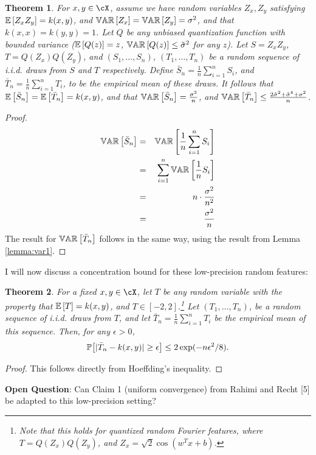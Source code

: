 \documentclass[12pt]{article}
\newcommand{\bS}{\bar{S}}
\newcommand{\bT}{\bar{T}}
\newcommand{\eps}{\epsilon}
\newcommand{\tsigma}{\tilde{\sigma}}
\newtheorem{theorem}{Theorem}[section]
\begin{document}
\begin{theorem}
\label{thm:varn}
For $x,y\in\cX$, assume we have random variables $Z_x,Z_y$ satisfying $\expect{}{Z_xZ_y} = k(x,y)$, and $\var{}{Z_x} = \var{}{Z_y} = \sigma^2$, and that $k(x,x) = k(y,y) = 1$.
Let $Q$ be any unbiased quantization function with bounded variance ($\expect{}{Q(z)} = z$, $\var{}{Q(z)} \leq \tsigma^2$ for any $z$).  Let $S=Z_x Z_y$, $T = Q(Z_x)Q(Z_y)$, and $(S_1,\ldots,S_n)$, $(T_1,\ldots,T_n)$ be a random sequence of i.i.d. draws from $S$ and $T$ respectively.  Define $\bar{S}_n = \frac{1}{n}\sum_{i=1}^n S_i$, and $\bar{T}_n =  \frac{1}{n}\sum_{i=1}^n T_i$, to be the empirical mean of these draws.  It follows that $\expect{}{\bS_n} = \expect{}{\bT_n} = k(x,y)$, and that
$\var{}{\bS_n} = \frac{\sigma^2}{n}$, and $\var{}{\bT_n} \leq \frac{2\tsigma^2 + \tsigma^4 +  \sigma^2}{n}$.
\end{theorem}
\begin{proof}
\begin{eqnarray*}
\var{}{\bS_n} &=& \var{}{\frac{1}{n}\sum_{i=1}^n S_i} \\
&=& \sum_{i=1}^n \var{}{\frac{1}{n}S_i} \\
&=& n \cdot \frac{\sigma^2}{n^2} \\
&=& \frac{\sigma^2}{n}
\end{eqnarray*}
The result for $\var{}{\bT_n}$ follows in the same way, using the result from Lemma \ref{lemma:var1}.
\end{proof}

I will now discuss a concentration bound for these low-precision random features:\\
\begin{theorem}
For a fixed $x,y\in\cX$, let $T$ be any random variable with the property that $\expect{}{T} = k(x,y)$, and $T \in [-2,2]$.\footnote{Note that this holds for quantized random Fourier features, where $T = Q(Z_x)Q(Z_y)$, and $Z_x = \sqrt{2}\cos(w^Tx+b)$.}  Let $(T_1,\ldots,T_n)$, be a random sequence of i.i.d. draws from $T$, and let $\bT_n = \frac{1}{n}\sum_{i=1}^n T_i$ be the empirical mean of this sequence.  Then, for any $\eps > 0$, $$\Prob{\big[|\bT_n - k(x,y)| \geq \epsilon\big]} \leq 2\exp(-n\eps^2/8).$$
\end{theorem}
\begin{proof}
	This follows directly from Hoeffding's inequality.
\end{proof}

\noindent\textbf{Open Question}: Can Claim 1 (uniform convergence) from Rahimi and Recht [5] be adapted to this low-precision setting?
\end{document}
